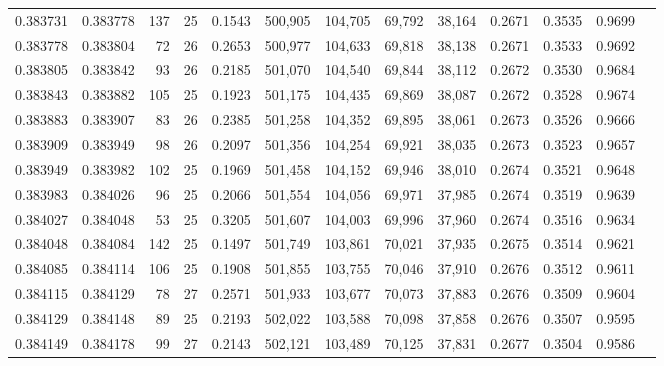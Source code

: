 \begin{tabular}{rrrrrrrrrrrrr}
0.383731 & 0.383778 &   137 &  25 &                                     0.1543 & 500,905 & 104,705 &  69,792 &  38,164 & 0.2671 & 0.3535 & 0.9699 \\
0.383778 & 0.383804 &    72 &  26 &                                     0.2653 & 500,977 & 104,633 &  69,818 &  38,138 & 0.2671 & 0.3533 & 0.9692 \\
0.383805 & 0.383842 &    93 &  26 &                                     0.2185 & 501,070 & 104,540 &  69,844 &  38,112 & 0.2672 & 0.3530 & 0.9684 \\
0.383843 & 0.383882 &   105 &  25 &                                     0.1923 & 501,175 & 104,435 &  69,869 &  38,087 & 0.2672 & 0.3528 & 0.9674 \\
0.383883 & 0.383907 &    83 &  26 &                                     0.2385 & 501,258 & 104,352 &  69,895 &  38,061 & 0.2673 & 0.3526 & 0.9666 \\
0.383909 & 0.383949 &    98 &  26 &                                     0.2097 & 501,356 & 104,254 &  69,921 &  38,035 & 0.2673 & 0.3523 & 0.9657 \\
0.383949 & 0.383982 &   102 &  25 &                                     0.1969 & 501,458 & 104,152 &  69,946 &  38,010 & 0.2674 & 0.3521 & 0.9648 \\
0.383983 & 0.384026 &    96 &  25 &                                     0.2066 & 501,554 & 104,056 &  69,971 &  37,985 & 0.2674 & 0.3519 & 0.9639 \\
0.384027 & 0.384048 &    53 &  25 &                                     0.3205 & 501,607 & 104,003 &  69,996 &  37,960 & 0.2674 & 0.3516 & 0.9634 \\
0.384048 & 0.384084 &   142 &  25 &                                     0.1497 & 501,749 & 103,861 &  70,021 &  37,935 & 0.2675 & 0.3514 & 0.9621 \\
0.384085 & 0.384114 &   106 &  25 &                                     0.1908 & 501,855 & 103,755 &  70,046 &  37,910 & 0.2676 & 0.3512 & 0.9611 \\
0.384115 & 0.384129 &    78 &  27 &                                     0.2571 & 501,933 & 103,677 &  70,073 &  37,883 & 0.2676 & 0.3509 & 0.9604 \\
0.384129 & 0.384148 &    89 &  25 &                                     0.2193 & 502,022 & 103,588 &  70,098 &  37,858 & 0.2676 & 0.3507 & 0.9595 \\
0.384149 & 0.384178 &    99 &  27 &                                     0.2143 & 502,121 & 103,489 &  70,125 &  37,831 & 0.2677 & 0.3504 & 0.9586 \\

\end{tabular}
